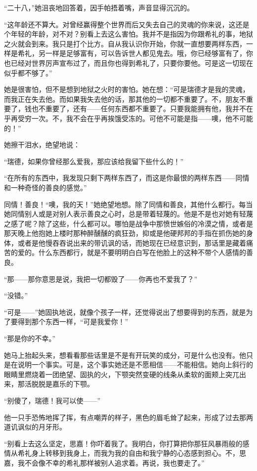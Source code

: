 \par “二十八，”她沮丧地回答着，因手帕捂着嘴，声音显得沉沉的。
\par “这年龄还不算大。对曾经赢得整个世界而后又失去自己的灵魂的你来说，这还是个年轻的年龄，对不对？别看上去这么害怕。我并不是指因为你跟希礼的事，地狱之火就会到来。我只是打个比方。自从我认识你开始，你就一直想要两样东西，一样是希礼，另一样是足够富有，可以告诉世人都见鬼去。哦，你已经够富有了，你也已经对世界厉声宣布过了，而且你也得到希礼了，只要你要他。可是这一切现在似乎都不够了。”
\par 她是很害怕，但不是想到地狱之火时的害怕。她在想：“可是瑞德才是我的灵魂，而我正在失去他。而如果我失去他的话，那其他的一切都不重要了。不，朋友不重要了，钱也不重要了，还有——任何东西都不重要了。只要我能拥有他，我并不在乎再受穷一次。不，我不会在乎再挨饿受冻的。可他不可能是指——噢，他不可能的！”
\par 她擦干泪水，绝望地说：
\par “瑞德，如果你曾经那么爱我，那应该给我留下些什么的！”
\par “在所有的东西中，我发现只剩下两样东西了，而这是你最恨的两样东西——同情和一种奇怪的善良的感觉。”
\par 同情！善良！“噢，我的天！”她绝望地想。除了同情和善良，其他什么都行。每当她同情别人或是对别人表示善良之心时，总是带着轻蔑的。他是不是也对她有轻蔑之感了呢？除了这些，什么都可以。哪怕是战争中那愤世嫉俗的冷漠之情，或者是那天晚上他抱她上楼时那种醉醺醺的疯狂劲，抑或是他硬邦邦的手指在抓伤她的身体，或者是他慢吞吞说出来的带讥讽的话，而她现在已经意识到，那话里是藏着痛苦的爱的。什么东西都行，就是不要明明白白写在他脸上的这种不带个人感情的善良。
\par “那——那你意思是说，我把一切都毁了——你再也不爱我了？”
\par “没错。”
\par “可是——”她固执地说，就像个孩子一样，还觉得说出了想要得到的东西，就是为了要得到那个东西一样，“可是我爱你！”
\par “那是你的不幸。”
\par 她马上抬起头来，想看看那些话里是不是有开玩笑的成分，可是什么也没有。他只是在说明一个事实。可是，这个事实她还是不愿相信——不能相信。她向上斜行的眼睛里燃烧着一团绝望、固执的火，下颚突然变硬的线条从柔软的面颊上突兀出来，那活脱脱是嘉乐的下颚。
\par “别傻了，瑞德！我可以使——”
\par 他一只手恐怖地挥了挥，有点嘲弄的样子，黑色的眉毛耸了起来，形成了过去那两道讥讽似的月牙形。
\par “别看上去这么坚定，思嘉！你吓着我了。我明白，你打算把你那狂风暴雨般的感情从希礼身上转移到我身上，而我为我的自由和我宁静的心态感到担心。不，思嘉，我不会像不幸的希礼那样被别人追求着。再说，我也要走了。”

